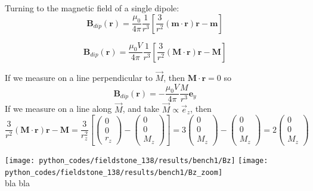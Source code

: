 Turning to the magnetic field of a single dipole:
\[
{\bm B}_{dip}({\bm r}) = \frac{\mu_0}{4\pi} \frac{1}{r^3} \left[ \frac{3}{r^2} ({\bm m} \cdot {\bm r}) {\bm r} - {\bm m}\right]
\]

\[
{\bm B}_{dip}({\bm r}) = \frac{\mu_0 V}{4\pi} \frac{1}{r^3} \left[ \frac{3}{r^2} ({\bm M} \cdot {\bm r}) {\bm r} - {\bm M}\right]
\]

If we measure on a line perpendicular to $\vec{M}$, then ${\bm M} \cdot {\bm r}=0$ so
\[
{\bm B}_{dip}({\bm r}) = -\frac{\mu_0 V}{4\pi} \frac{M}{r^3}   {\bm e}_y
\]
If we measure on a line along $\vec{M}$, and take $\vec{M} \propto \vec{e}_z$, then 
\[
\frac{3}{r^2} ({\bm M} \cdot {\bm r}) {\bm r} - {\bm M}
=
\frac{3}{r_z^2} 
\left[
\left(
\begin{array}{c}
0 \\ 0 \\ r_z
\end{array}
\right)
-
\left(
\begin{array}{c}
0 \\ 0 \\ M_z
\end{array}
\right)
\right]
=
3\left(
\begin{array}{c}
0 \\ 0 \\ M_z
\end{array}
\right)
-
\left(
\begin{array}{c}
0 \\ 0 \\ M_z
\end{array}
\right)
=
2
\left(
\begin{array}{c}
0 \\ 0 \\ M_z
\end{array}
\right)
\]




\begin{center}
\texttt{[image: python\_codes/fieldstone\_138/results/bench1/Bz]}
\texttt{[image: python\_codes/fieldstone\_138/results/bench1/Bz\_zoom]}\\
{\captionfont bla bla}
\end{center}




